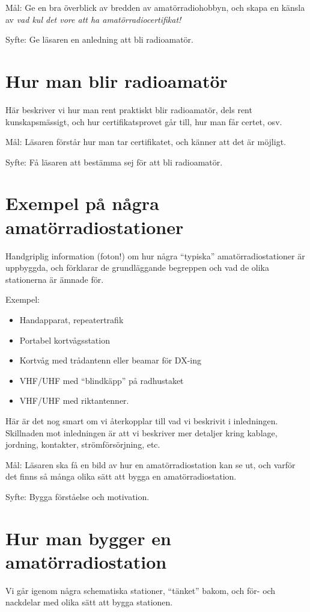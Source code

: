 \documentclass[a4paper,twoside,openright]{book}
\begin{document}
Mål: Ge en bra överblick av bredden av amatörradiohobbyn, och skapa en
känsla av \emph{vad kul det vore att ha amatörradiocertifikat!}

Syfte: Ge läsaren en anledning att bli radioamatör.

\section{Hur man blir radioamatör}
Här beskriver vi hur man rent praktiskt blir radioamatör, dels rent
kunskaps\-mässigt, och hur certifikatsprovet går till, hur man får
certet, osv.

Mål: Läsaren förstår hur man tar certifikatet, och känner att det är
möjligt.

Syfte: Få läsaren att bestämma sej för att bli radioamatör.

\section{Exempel på några amatörradiostationer}
Handgriplig information (foton!) om hur några ``typiska''
amatörradiostationer är uppbyggda, och förklarar de grundläggande
begreppen och vad de olika stationerna är ämnade för.

Exempel:
\begin{itemize}
\item Handapparat, repeatertrafik
\item Portabel kortvågsstation
\item Kortvåg med trådantenn eller beamar för DX-ing
\item VHF/UHF med ``blindkäpp'' på radhustaket
\item VHF/UHF med riktantenner.
\end{itemize}

Här är det nog smart om vi återkopplar till vad vi beskrivit i
inledningen. Skillnaden mot inledningen är att vi beskriver mer
detaljer kring kablage, jordning, kontakter, strömförsörjning, etc.

Mål: Läsaren ska få en bild av hur en amatörradiostation kan se ut,
och varför det finns så många olika sätt att bygga en
amatörradiostation.

Syfte: Bygga förståelse och motivation.

\section{Hur man bygger en amatörradiostation}
Vi går igenom några schematiska stationer, ``tänket'' bakom, och för-
och nackdelar med olika sätt att bygga stationen.
\end{document}
